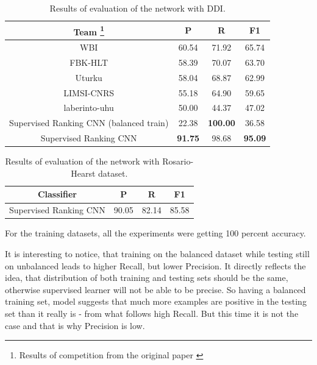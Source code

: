 \begin{table}
  \centering
     \begin{tabular}{ | c | c | c | c | }
    \hline
    Team \footnote{Results of competition from the original paper \cite{segura20111st}} & P & R & F1 \\ \hline
    WBI &  60.54 & 71.92 & 65.74 \\ \hline
    FBK-HLT &  58.39 & 70.07 & 63.70 \\ \hline
    Uturku &  58.04 & 68.87 & 62.99 \\ \hline
    LIMSI-CNRS &  55.18 & 64.90 & 59.65 \\ \hline
    laberinto-uhu &  50.00 & 44.37 & 47.02 \\ \hline
    Supervised Ranking CNN (balanced train) & 22.38 & \textbf{100.00} & 36.58 \\ \hline
    Supervised Ranking CNN & \textbf{91.75} & 98.68 & \textbf{95.09} \\ \hline
    \end{tabular}
  \caption[Medical domain, DDI evaluation results]{Results of evaluation of the network with DDI.}
\label{tab:test-ddi}
\end{table}

\begin{table}
  \begin{center}
      \begin{tabular}{ | c | c | c | c | }
    \hline
    Classifier & P & R & F1 \\ \hline
    Supervised Ranking CNN & 90.05 & 82.14 & 85.58 \\ \hline
    \end{tabular}
\caption[Medical domain, Rosario-Hearst evaluation results]{Results of evaluation of the network with Rosario-Hearst dataset.}
\label{tab:test-ros-hearst}
\end{center}
\end{table}

For the training datasets, all the experiments were getting 100 percent accuracy. 

It is interesting to notice, that training on the balanced dataset while testing still on unbalanced 
leads to higher Recall, but lower Precision. It directly reflects the idea, that distribution of both 
training and testing sets should be the same, otherwise supervised learner will not be able to 
be precise. So having a balanced training set, model suggests that much more examples are 
positive in the testing set than it really is - from what follows high Recall. But this time it is not the 
case and that is why Precision is low.

